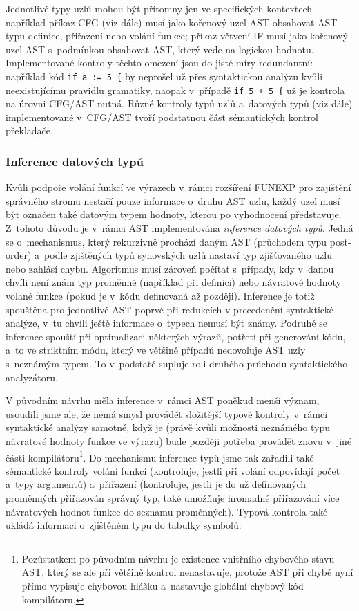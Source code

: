 \documentclass[11pt]{article}
\begin{document}
Jednotlivé typy uzlů mohou být přítomny jen ve specifických kontextech -- například příkaz CFG (viz dále) musí jako kořenový uzel AST obsahovat AST typu definice, přiřazení nebo volání funkce; příkaz větvení IF musí jako kořenový uzel AST s~podmínkou obsahovat AST, který vede na logickou hodnotu. Implementované kontroly těchto omezení jsou do jisté míry redundantní: například kód \texttt{if a := 5 \{} by neprošel už přes syntaktickou analýzu kvůli neexistujícímu pravidlu gramatiky, naopak v~případě \texttt{if 5 + 5 \{} už je kontrola na úrovni CFG/AST nutná. Různé kontroly typů uzlů a~datových typů (viz dále) implementované v~CFG/AST tvoří podstatnou část sémantických kontrol překladače.

\subsubsection{Inference datových typů}
\label{sec:inference}

Kvůli podpoře volání funkcí ve výrazech v~rámci rozšíření FUNEXP pro zajištění správného stromu nestačí pouze informace o~druhu AST uzlu, každý uzel musí být označen také datovým typem hodnoty, kterou po vyhodnocení představuje. Z~tohoto důvodu je v~rámci AST implementována \emph{inference datových typů}. Jedná se o~mechanismus, který rekurzivně prochází daným AST (průchodem typu post-order) a~podle zjištěných typů synovských uzlů nastaví typ zjišťovaného uzlu nebo zahlásí chybu. Algoritmus musí zároveň počítat s~případy, kdy v~danou chvíli není znám typ proměnné (například při definici) nebo návratové hodnoty volané funkce (pokud je v~kódu definovaná až později). Inference je totiž spouštěna pro jednotlivé AST poprvé při redukcích v precedenční syntaktické analýze, v~tu chvíli ještě informace o~typech nemusí být známy. Podruhé se inference spouští při optimalizaci některých výrazů, potřetí při generování kódu, a~to ve striktním módu, který ve většině případů nedovoluje AST uzly s~neznámým typem. To v~podstatě supluje roli druhého průchodu syntaktického analyzátoru.

V původním návrhu měla inference v~rámci AST poněkud menší význam, usoudili jsme ale, že nemá smysl provádět složitější typové kontroly v~rámci syntaktické analýzy samotné, když je (právě kvůli možnosti neznámého typu návratové hodnoty funkce ve výrazu) bude později potřeba provádět znovu v~jiné části kompilátoru\footnote{Pozůstatkem po původním návrhu je existence vnitřního chybového stavu AST, který se ale při většině kontrol nenastavuje, protože AST při chybě nyní přímo vypisuje chybovou hlášku a~nastavuje globální chybový kód kompilátoru.}. Do mechanismu inference typů jsme tak zařadili také sémantické kontroly volání funkcí (kontroluje, jestli při volání odpovídají počet a~typy argumentů) a~přiřazení (kontroluje, jestli je do už definovaných proměnných přiřazován správný typ, také umožňuje hromadné přiřazování více návratových hodnot funkce do seznamu proměnných). Typová kontrola také ukládá informaci o~zjištěném typu do tabulky symbolů.
\end{document}
